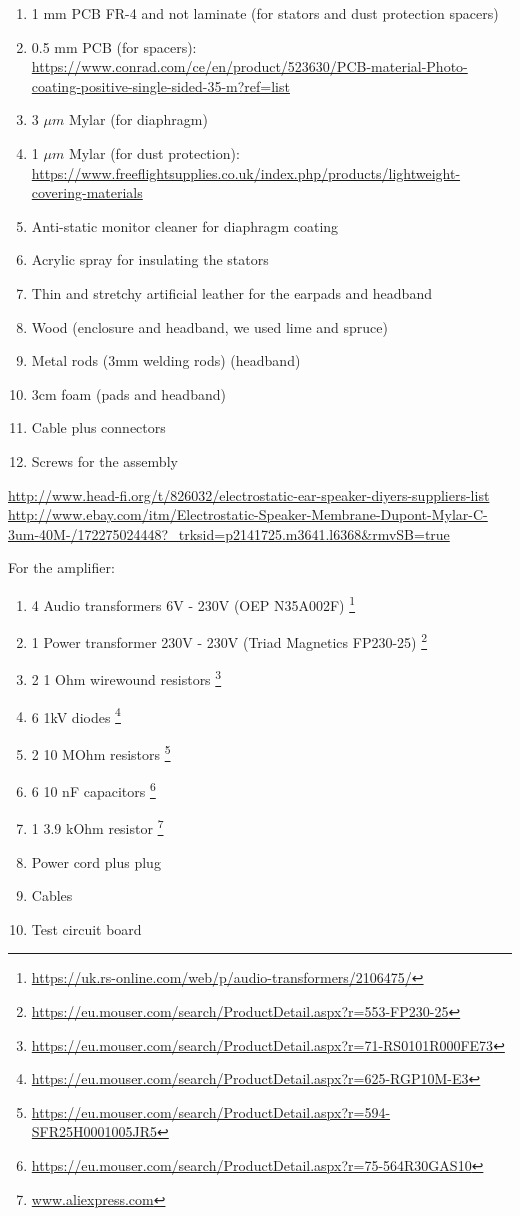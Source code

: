 \documentclass{article}
\begin{document}
\begin{enumerate}
    \item 1 mm PCB FR-4 and not laminate (for stators and dust protection spacers) 
    \item 0.5 mm PCB (for spacers): \url{https://www.conrad.com/ce/en/product/523630/PCB-material-Photo-coating-positive-single-sided-35-m?ref=list}
    \item 3 $\mu m$ Mylar (for diaphragm)
    \item 1 $\mu m$ Mylar (for dust protection): \url{https://www.freeflightsupplies.co.uk/index.php/products/lightweight-covering-materials}
    \item Anti-static monitor cleaner for diaphragm coating
    \item Acrylic spray for insulating the stators
    \item Thin and stretchy artificial leather for the earpads and headband
    \item Wood (enclosure and headband, we used lime and spruce)
    \item Metal rods (3mm welding rods) (headband)
    \item 3cm foam (pads and headband)
    \item Cable plus connectors
    \item Screws for the assembly 
\end{enumerate}
\url{http://www.head-fi.org/t/826032/electrostatic-ear-speaker-diyers-suppliers-list}
\url{http://www.ebay.com/itm/Electrostatic-Speaker-Membrane-Dupont-Mylar-C-3um-40M-/172275024448?_trksid=p2141725.m3641.l6368&rmvSB=true}

For the amplifier:
\begin{enumerate}
    \item 4 Audio transformers 6V - 230V (OEP N35A002F) \footnote{\url{https://uk.rs-online.com/web/p/audio-transformers/2106475/}}
    \item 1 Power transformer 230V - 230V (Triad Magnetics FP230-25) \footnote{\url{https://eu.mouser.com/search/ProductDetail.aspx?r=553-FP230-25}}
    \item 2 1 Ohm wirewound resistors \footnote{\url{https://eu.mouser.com/search/ProductDetail.aspx?r=71-RS0101R000FE73}}
    \item 6 1kV diodes \footnote{\url{https://eu.mouser.com/search/ProductDetail.aspx?r=625-RGP10M-E3}}
    \item 2 10 MOhm resistors \footnote{\url{https://eu.mouser.com/search/ProductDetail.aspx?r=594-SFR25H0001005JR5}}
    \item 6 10 nF capacitors \footnote{\url{https://eu.mouser.com/search/ProductDetail.aspx?r=75-564R30GAS10}}
    \item 1 3.9 kOhm resistor \footnote{\url{www.aliexpress.com}}
    \item Power cord plus plug
    \item Cables
    \item Test circuit board
\end{enumerate}
\end{document}
